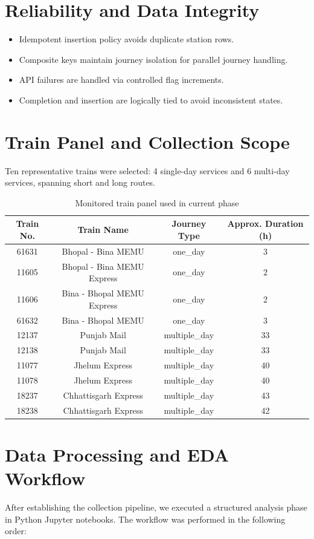 \documentclass[12pt,a4paper]{report}
\begin{document}
\section{Reliability and Data Integrity}
\begin{itemize}
    \item Idempotent insertion policy avoids duplicate station rows.
    \item Composite keys maintain journey isolation for parallel journey handling.
    \item API failures are handled via controlled flag increments.
    \item Completion and insertion are logically tied to avoid inconsistent states.
\end{itemize}

\section{Train Panel and Collection Scope}
Ten representative trains were selected: 4 single-day services and 6 multi-day services, spanning short and long routes.

\begin{table}[H]
\centering
\caption{Monitored train panel used in current phase}
\label{tab:trains}
\begin{tabular}{cccc}
\toprule
Train No. & Train Name & Journey Type & Approx. Duration (h) \\
\midrule
61631 & Bhopal - Bina MEMU & one\_day & 3 \\
11605 & Bhopal - Bina MEMU Express & one\_day & 2 \\
11606 & Bina - Bhopal MEMU Express & one\_day & 2 \\
61632 & Bina - Bhopal MEMU & one\_day & 3 \\
12137 & Punjab Mail & multiple\_day & 33 \\
12138 & Punjab Mail & multiple\_day & 33 \\
11077 & Jhelum Express & multiple\_day & 40 \\
11078 & Jhelum Express & multiple\_day & 40 \\
18237 & Chhattisgarh Express & multiple\_day & 43 \\
18238 & Chhattisgarh Express & multiple\_day & 42 \\
\bottomrule
\end{tabular}
\end{table}

\section{Data Processing and EDA Workflow}
After establishing the collection pipeline, we executed a structured analysis phase in Python Jupyter notebooks. The workflow was performed in the following order:
\end{document}
